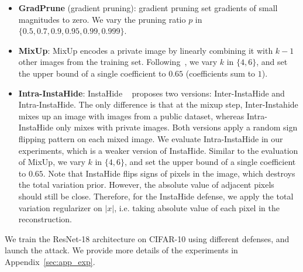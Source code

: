 \begin{itemize}
  \item {\bf GradPrune} (gradient pruning): gradient pruning set gradients of small magnitudes to zero. We vary the pruning ratio $p$ in $\{0.5, 0.7, 0.9, 0.95, 0.99, 0.999\}$. 
  \item {\bf MixUp}: MixUp encodes a private image by linearly combining it with $k-1$ other images from the training set. Following~\citep{huang2020instahide}, we vary $k$ in $\{4, 6\}$, and set the upper bound of a single coefficient to $0.65$ (coefficients sum to $1$). 
  \item {\bf Intra-InstaHide}: InstaHide ~\citep{huang2020instahide} proposes two versions: Inter-InstaHide and Intra-InstaHide. The only difference is that at the mixup step, Inter-Instahide mixes up an image with images from a public dataset, whereas Intra-InstaHide only mixes with private images. Both versions apply a random sign flipping pattern on each mixed image.
  We evaluate Intra-InstaHide in our experiments, which is a weaker version of InstaHide. Similar to the evaluation of MixUp, we vary $k$ in $\{4, 6\}$, and set the upper bound of a single coefficient to $0.65$. Note that InstaHide flips signs of pixels in the image, which destroys the total variation prior. However, the absolute value of adjacent pixels should still be close. Therefore, for the InstaHide defense, we apply the total variation regularizer on $|x|$, i.e. taking absolute value of each pixel in the reconstruction.
\end{itemize}


We train the ResNet-18 architecture on CIFAR-10 using different defenses, and launch the attack. We provide more details of the experiments in Appendix~\ref{sec:app_exp}. 


